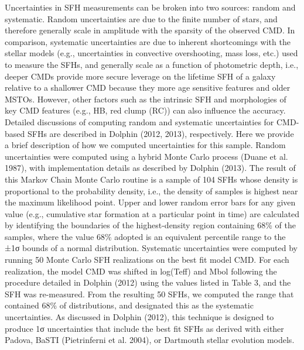 Uncertainties in SFH measurements can be broken into two sources: random and systematic. Random uncertainties are due to the finite number of stars, and therefore generally scale in amplitude with the sparsity of the observed CMD. In comparison, systematic uncertainties are due to inherent shortcomings with the stellar models (e.g., uncertainties in convective overshooting, mass loss, etc.) used to measure the SFHs, and generally scale as a function of photometric depth, i.e., deeper CMDs provide more secure leverage on the lifetime SFH of a galaxy relative to a shallower CMD because they more age sensitive features and older MSTOs. However, other factors such as the intrinsic SFH and morphologies of key CMD features (e.g., HB, red clump (RC)) can also influence the accuracy. Detailed discussions of computing random and systematic uncertainties for CMD-based SFHs are described in Dolphin (2012, 2013), respectively. Here we provide a brief description of how we computed uncertainties for this sample.
Random uncertainties were computed using a hybrid Monte Carlo process (Duane et al. 1987), with implementation details as described by Dolphin (2013). The result of this Markov Chain Monte Carlo routine is a sample of 104 SFHs whose density is proportional to the probability density, i.e., the density of samples is highest near the maximum likelihood point. Upper and lower random error bars for any given value (e.g., cumulative star formation at a particular point in time) are calculated by identifying the boundaries of the highest-density region containing 68\% of the samples, where the value 68\% adopted is an equivalent percentile range to the ±1σ bounds of a normal distribution.
Systematic uncertainties were computed by running 50 Monte Carlo SFH realizations on the best fit model CMD. For each realization, the model CMD was shifted in log(Teff) and Mbol following the procedure detailed in Dolphin (2012) using the values listed in Table 3, and the SFH was re-measured. From the resulting 50 SFHs, we computed the range that contained 68\% of distributions, and designated this as the systematic uncertainties. As discussed in Dolphin (2012), this technique is designed to produce 1σ uncertainties that include the best fit SFHs as derived with either Padova, BaSTI (Pietrinferni et al. 2004), or Dartmouth stellar evolution models.


